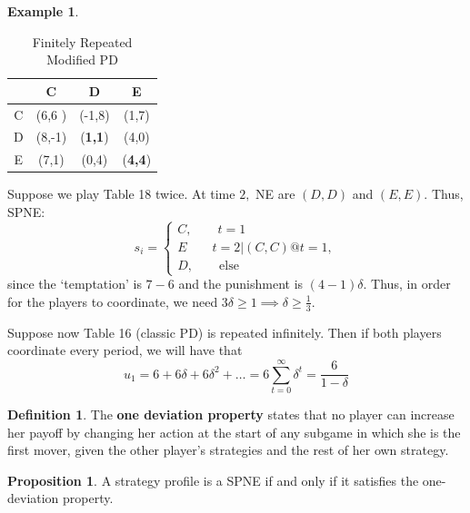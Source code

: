 \documentclass[10pt, oneside]{article}
\theoremstyle{definition}
\newtheorem{exmp}{Example}[section]
\newtheorem{defn}{Definition}
\newtheorem{prop}{Proposition}
\begin{document}
\begin{exmp}
    \begin{table}[H]
        \centering
        \begin{tabular}{c|c|c | c}
             & C & D & E\\
             \hline
             C& (6,6 ) & (-1,8) & (1,7) \\
             \hline
             D&  (8,-1)& (\textbf{1,1}) & (4,0)\\
             \hline
             E & (7,1) & (0,4) & (\textbf{4,4})
        \end{tabular}
        \caption{Finitely Repeated Modified PD}
    \end{table}
    Suppose we play Table 18 twice. At time $2,$ NE are $(D,D)$ and $(E,E).$ Thus, SPNE:
    \[s_i = \begin{cases}
        C, \qquad t = 1\\
        E\qquad t = 2 | (C,C) @t = 1,\\
        D, \qquad \text{else}
    \end{cases}\] since 
    the `temptation'  is $7-6$ and the punishment is $(4 - 1)\delta.$ Thus, in order for the players to coordinate, we need $3\delta \geq 1 \implies \delta\geq \frac{1}{3}.$
\end{exmp}
Suppose now Table 16 (classic PD) is repeated infinitely. Then if both players coordinate every period, we will have that 
\[u_1 = 6 + 6\delta+ 6\delta^2 + \dots = 6\sum_{t=0}^\infty \delta^t = \frac{6}{1-\delta}\]

\begin{defn}
    The \textbf{one deviation property} states that no player can increase her payoff by changing her action at the start of any subgame in which she is the first mover, given the other player's strategies and the rest of her own strategy.
\end{defn}

\begin{prop}
    A strategy profile is a SPNE if and only if it satisfies the one-deviation property.
\end{prop}

\newpage
\end{document}
